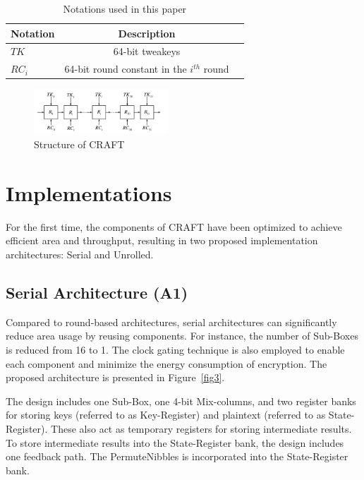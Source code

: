 \documentclass[final,5p,times,twocolumn]{elsarticle}
\begin{document}
\begin{table}[h]
    \centering
    \caption{Notations used in this paper}\label{tab1}%
    \begin{tabular}{lcc}
        \toprule
        Notation & Description                                 \\
        \midrule
        $TK$     & 64-bit tweakeys                             \\
        $RC_i$   & 64-bit round constant in the $i^{th}$ round \\
        \bottomrule
    \end{tabular}
\end{table}

\begin{figure}[h]%
    \centering
    \includegraphics[width=0.45\textwidth]{struct-craft.pdf}
    \caption{Structure of CRAFT}\label{fig1}
\end{figure}

\section{Implementations}\label{sec3}

For the first time, the components of CRAFT have been optimized to achieve efficient area and throughput, resulting in two proposed implementation architectures: Serial and Unrolled.


\subsection{Serial Architecture (A1)}\label{subsec2}
Compared to round-based architectures, serial architectures can significantly reduce area usage by reusing components. For instance, the number of Sub-Boxes is reduced from 16 to 1. The clock gating technique is also employed to enable each component and minimize the energy consumption of encryption. The proposed architecture is presented in Figure~\ref{fig3}.

The design includes one Sub-Box, one 4-bit Mix-columns, and two register banks for storing keys (referred to as Key-Register) and plaintext (referred to as State-Register). These also act as temporary registers for storing intermediate results. To store intermediate results into the State-Register bank, the design includes one feedback path. The PermuteNibbles is incorporated into the State-Register bank.
\end{document}
